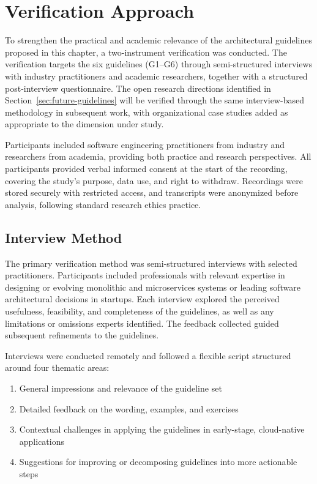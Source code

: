 \pagebreak
\section{Verification Approach}
\label{sec:verification-plan}

To strengthen the practical and academic relevance of the architectural guidelines proposed in this chapter, a two-instrument verification was conducted. The verification targets the six guidelines (G1--G6) through semi-structured interviews with industry practitioners and academic researchers, together with a structured post-interview questionnaire. The open research directions identified in Section~\ref{sec:future-guidelines} will be verified through the same interview-based methodology in subsequent work, with organizational case studies added as appropriate to the dimension under study.

Participants included software engineering practitioners from industry and researchers from academia, providing both practice and research perspectives. All participants provided verbal informed consent at the start of the recording, covering the study's purpose, data use, and right to withdraw. Recordings were stored securely with restricted access, and transcripts were anonymized before analysis, following standard research ethics practice.

\subsection*{Interview Method}

The primary verification method was semi-structured interviews with selected practitioners. Participants included professionals with relevant expertise in designing or evolving monolithic and microservices systems or leading software architectural decisions in startups. Each interview explored the perceived usefulness, feasibility, and completeness of the guidelines, as well as any limitations or omissions experts identified. The feedback collected guided subsequent refinements to the guidelines.

Interviews were conducted remotely and followed a flexible script structured around four thematic areas:

\begin{enumerate}[itemsep=8pt,topsep=2pt]
  \item General impressions and relevance of the guideline set
  \item Detailed feedback on the wording, examples, and exercises
  \item Contextual challenges in applying the guidelines in early-stage, cloud-native applications
  \item Suggestions for improving or decomposing guidelines into more actionable steps
\end{enumerate}

